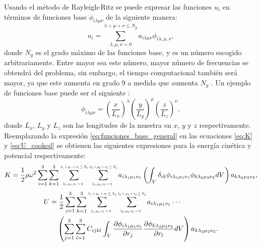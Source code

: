 \documentclass[12pt]{article}
\newcommand*{\Scale}[2][4]{\scalebox{#1}{$#2$}}%
\begin{document}
Usando el método de Rayleigh-Ritz \cite{MIGLIORI19931} se puede expresar las funciones $u_i$ en términos de funciones base $\phi_{i \lambda \mu \nu}$ de la siguiente manera: 
\begin{equation}
	u_i = \sum_{\lambda,\mu,\nu=0}^{\lambda + \mu + \nu \le N_g}{a_{i\lambda\mu\nu} \phi_{i\lambda,\mu,\nu}},
	\label{eq:funciones_base_general}
\end{equation}
donde $N_g$ es el grado máximo de las funciones base, y es un número escogido arbitrariamente. Entre mayor sea este número, mayor número de frecuencias se obtendrá del problema, sin embargo, el tiempo computacional también será mayor, ya que este aumenta en grado 9 a medida que aumenta $N_g$ \cite{Leisure_1997}. Un ejemplo de funciones base puede ser el siguiente \cite{Demarest}:
\begin{equation}
    \phi_{i \lambda \mu \nu} = \left(\frac{x}{L_x} \right)^{\lambda} \left(\frac{y}{L_y} \right)^{\mu} \left(\frac{z}{L_z} \right)^{\nu},
	\label{eq:funciones_base_potencias}
\end{equation}
donde $L_x$, $L_y$ y $L_z$ son las longitudes de la muestra en $x$, $y$ y $z$ respectivamente. Reemplazando la expresión \ref{eq:funciones_base_general} en las ecuaciones \ref{eq:K} y \ref{eq:U_cooked} se obtienen las siguientes expresiones para la energía cinética y potencial respectivamente:
\begin{equation}
	K = \frac{1}{2} \rho \omega^2 \sum_{i=1}^{3}\sum_{k=1}^{3}\sum_{\Scale[0.5]{\lambda_1,\mu_1,\nu_1 = 0}}^{\Scale[0.5]{\lambda_1 + \mu_1 + \nu_1 \le N_g}} \sum_{\Scale[0.5]{\lambda_2,\mu_2,\nu_2 = 0}}^{\Scale[0.5]{\lambda_2 + \mu_2 + \nu_2 \le N_g}} {a_{i \lambda_1 \mu_1 \nu_1} \left(\int_{V} {\delta_{ik} \phi_{i \lambda_1 \mu_1 \nu_1} \phi_{k \lambda_2 \mu_2 \nu_2} dV} \right) a_{k \lambda_2 \mu_2 \nu_2}},
	\label{eq:K_final}
\end{equation}
\begin{align}
	U = &\;\frac{1}{2} \sum_{i=1}^{3}\sum_{k=1}^{3}\sum_{\Scale[0.5]{\lambda_1,\mu_1,\nu_1 = 0}}^{\Scale[0.5]{\lambda_1 + \mu_1 + \nu_1 \le N_g}} \sum_{\Scale[0.5]{\lambda_2,\mu_2,\nu_2 = 0}}^{\Scale[0.5]{\lambda_2 + \mu_2 + \nu_2 \le N_g}} a_{i \lambda_1 \mu_1 \nu_1} \cdots \nonumber \\ &\left(\sum_{j=1}^{3}\sum_{l=1}^{3} C_{ijkl}\int_{V} { \frac{\partial \phi_{i \lambda_1 \mu_1 \nu_1}}{\partial r_j} \frac{\partial \phi_{k \lambda_2 \mu_2 \nu_2}}{\partial r_l} dV} \right) a_{k \lambda_2 \mu_2 \nu_2}.
	\label{eq:U_final}
\end{align}
\end{document}
